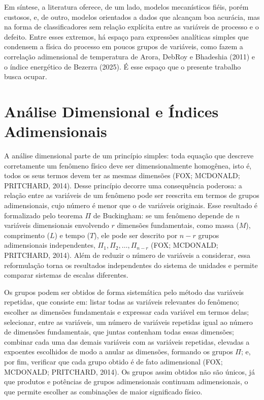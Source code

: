 \documentclass[12pt,openany]{report}
\begin{document}
Em síntese, a literatura oferece, de um lado, modelos mecanísticos fiéis, porém custosos, e, de outro, modelos orientados a dados que alcançam boa acurácia, mas na forma de classificadores sem relação explícita entre as variáveis de processo e o defeito. Entre esses extremos, há espaço para expressões analíticas simples que condensem a física do processo em poucos grupos de variáveis, como fazem a correlação adimensional de temperatura de Arora, DebRoy e Bhadeshia (2011) e o índice energético de Bezerra (2025). É esse espaço que o presente trabalho busca ocupar.

\section{Análise Dimensional e Índices Adimensionais}
\label{sec:analise_dimensional}

A análise dimensional parte de um princípio simples: toda equação que descreve corretamente um fenômeno físico deve ser dimensionalmente homogênea, isto é, todos os seus termos devem ter as mesmas dimensões (FOX; MCDONALD; PRITCHARD, 2014). Desse princípio decorre uma consequência poderosa: a relação entre as variáveis de um fenômeno pode ser reescrita em termos de grupos adimensionais, cujo número é menor que o de variáveis originais. Esse resultado é formalizado pelo teorema $\Pi$ de Buckingham: se um fenômeno depende de $n$ variáveis dimensionais envolvendo $r$ dimensões fundamentais, como massa ($M$), comprimento ($L$) e tempo ($T$), ele pode ser descrito por $n - r$ grupos adimensionais independentes, $\Pi_1, \Pi_2, \ldots, \Pi_{n-r}$ (FOX; MCDONALD; PRITCHARD, 2014). Além de reduzir o número de variáveis a considerar, essa reformulação torna os resultados independentes do sistema de unidades e permite comparar sistemas de escalas diferentes.

Os grupos podem ser obtidos de forma sistemática pelo método das variáveis repetidas, que consiste em: listar todas as variáveis relevantes do fenômeno; escolher as dimensões fundamentais e expressar cada variável em termos delas; selecionar, entre as variáveis, um número de variáveis repetidas igual ao número de dimensões fundamentais, que juntas contenham todas essas dimensões; combinar cada uma das demais variáveis com as variáveis repetidas, elevadas a expoentes escolhidos de modo a anular as dimensões, formando os grupos $\Pi$; e, por fim, verificar que cada grupo obtido é de fato adimensional (FOX; MCDONALD; PRITCHARD, 2014). Os grupos assim obtidos não são únicos, já que produtos e potências de grupos adimensionais continuam adimensionais, o que permite escolher as combinações de maior significado físico.
\end{document}
